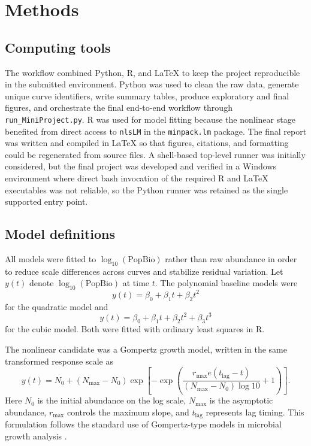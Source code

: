 \documentclass[11pt]{article}
\begin{document}
\section{Methods}
\subsection{Computing tools}
The workflow combined Python, R, and \LaTeX{} to keep the project reproducible in the submitted environment. Python was used to clean the raw data, generate unique curve identifiers, write summary tables, produce exploratory and final figures, and orchestrate the final end-to-end workflow through \texttt{run\_MiniProject.py}. R was used for model fitting because the nonlinear stage benefited from direct access to \texttt{nlsLM} in the \texttt{minpack.lm} package. The final report was written and compiled in \LaTeX{} so that figures, citations, and formatting could be regenerated from source files. A shell-based top-level runner was initially considered, but the final project was developed and verified in a Windows environment where direct bash invocation of the required R and LaTeX executables was not reliable, so the Python runner was retained as the single supported entry point.

\subsection{Model definitions}
All models were fitted to $\log_{10}(\mathrm{PopBio})$ rather than raw abundance in order to reduce scale differences across curves and stabilize residual variation. Let $y(t)$ denote $\log_{10}(\mathrm{PopBio})$ at time $t$. The polynomial baseline models were
\[
y(t)=\beta_0+\beta_1 t+\beta_2 t^2
\]
for the quadratic model and
\[
y(t)=\beta_0+\beta_1 t+\beta_2 t^2+\beta_3 t^3
\]
for the cubic model. Both were fitted with ordinary least squares in R.

The nonlinear candidate was a Gompertz growth model, written in the same transformed response scale as
\[
y(t)=N_0+(N_{\max}-N_0)\exp\left[-\exp\left(\frac{r_{\max}e(t_{\mathrm{lag}}-t)}{(N_{\max}-N_0)\log 10}+1\right)\right].
\]
Here $N_0$ is the initial abundance on the log scale, $N_{\max}$ is the asymptotic abundance, $r_{\max}$ controls the maximum slope, and $t_{\mathrm{lag}}$ represents lag timing. This formulation follows the standard use of Gompertz-type models in microbial growth analysis \citep{Zwietering1990}.
\end{document}
